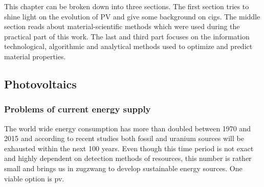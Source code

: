 
This chapter can be broken down into three sections. 
The first section tries to shine light on the evolution of PV and give some background on \gls{cigs}.
The middle section reads about material-scientific methods which were used during the practical part of this work. 
The last and third part focuses on the information technological, algorithmic and analytical methods used to optimize and predict material properties. 

\subsection{Photovoltaics}
%
\subsubsection{Problems of current energy supply}
The world wide energy consumption has more than doubled between 1970 and 2015\cite{BP2017} 
and according to recent studies both fossil\cite{BGR2017} and uranium sources\cite{Uran2006} 
will be exhausted within the next 100 years. 
Even though this time period is not exact and highly dependent on detection methods of resources, 
this number is rather small and brings us in zugzwang to develop sustainable energy sources. 
One viable option is \gls{pv}.

